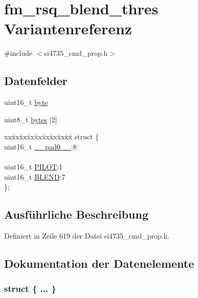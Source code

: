 \hypertarget{unionfm__rsq__blend__thres}{}\section{fm\+\_\+rsq\+\_\+blend\+\_\+thres Variantenreferenz}
\label{unionfm__rsq__blend__thres}


{\ttfamily \#include $<$si4735\+\_\+cmd\+\_\+prop.\+h$>$}

\subsection*{Datenfelder}
\begin{DoxyCompactItemize}
\item 
uint16\+\_\+t \hyperlink{unionfm__rsq__blend__thres_ab0549c1b5ea980a02e7eab77e21fea49}{byte}
\item 
uint8\+\_\+t \hyperlink{unionfm__rsq__blend__thres_a46e4c05d20a047ec169f60d3167e912e}{bytes} \mbox{[}2\mbox{]}
\item 
\begin{tabbing}
xx\=xx\=xx\=xx\=xx\=xx\=xx\=xx\=xx\=\kill
struct \{\\
\>uint16\_t \hyperlink{unionfm__rsq__blend__thres_a77132c2c26a75f5b8751b235cda23828}{\_\_pad0\_\_}:8\\
\>\\
\>uint16\_t \hyperlink{unionfm__rsq__blend__thres_acfac363989b431911806622060eda094}{PILOT}:1\\
\>uint16\_t \hyperlink{unionfm__rsq__blend__thres_a7fff6ea820b5ed6b06e0df95ef82f3d8}{BLEND}:7\\
\}; \\

\end{tabbing}\end{DoxyCompactItemize}


\subsection{Ausführliche Beschreibung}


Definiert in Zeile 619 der Datei si4735\+\_\+cmd\+\_\+prop.\+h.



\subsection{Dokumentation der Datenelemente}
\hypertarget{unionfm__rsq__blend__thres_a1453eb48573f17084ad2a40d4090b707}{}\subsubsection[{"@71}]{\setlength{\rightskip}{0pt plus 5cm}struct \{ ... \} }\label{unionfm__rsq__blend__thres_a1453eb48573f17084ad2a40d4090b707}
\hypertarget{unionfm__rsq__blend__thres_a77132c2c26a75f5b8751b235cda23828}{}
